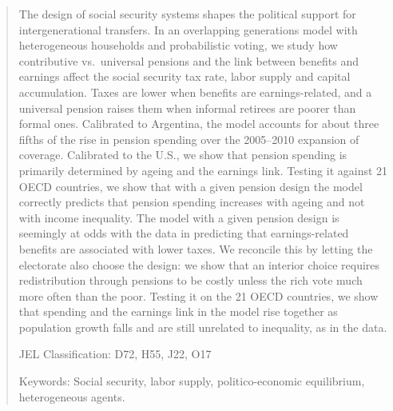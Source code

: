 \begin{abstract}
\noindent


The design of social security systems shapes the political support for intergenerational transfers. In an overlapping generations model with heterogeneous households and probabilistic voting, we study how contributive vs.\ universal pensions and the link between benefits and earnings affect the social security tax rate, labor supply and capital accumulation. Taxes are lower when benefits are earnings-related, and a universal pension raises them when informal retirees are poorer than formal ones. Calibrated to Argentina, the model accounts for about three fifths of the rise in pension spending over the 2005--2010 expansion of coverage. Calibrated to the U.S., we show that pension spending is primarily determined by ageing and the earnings link. Testing it against 21 OECD countries, we show that with a given pension design the model correctly predicts that pension spending increases with ageing and not with income inequality. The model with a given pension design is seemingly at odds with the data in predicting that earnings-related benefits are associated with lower taxes. We reconcile this by letting the electorate also choose the design: we show that an interior choice requires redistribution through pensions to be costly unless the rich vote much more often than the poor. Testing it on the 21 OECD countries, we show that spending and the earnings link in the model rise together as population growth falls and are still unrelated to inequality, as in the data. 

\vspace{.3cm}

\noindent
JEL Classification: D72, H55, J22, O17

\vspace{.3cm}
\noindent Keywords: Social security, labor supply, politico-economic equilibrium, heterogeneous agents.
\end{abstract}

